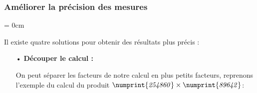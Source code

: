\documentclass[a4paper]{article}
\begin{document}
\vfill

\pagebreak







\subsubsection*{Améliorer la précision des mesures}

{\parindent = 0cm}

Il existe quatre solutions pour obtenir des résultats plus précis :

\begin{itemize}
	
	
	\vspace{0.2cm}
	
	\item[•] \textbf{Découper le calcul :}
	
	\begin{small}
	On peut séparer les facteurs de notre calcul en plus petits facteurs, reprenons l'exemple du calcul du produit $\mathit{\numprint{254860} \times \numprint{89642}}$:\\
	
	\vspace{-2mm}
	\begin{itemize}
	
		

\end{itemize}
\end{small}
\end{itemize}
\end{document}
